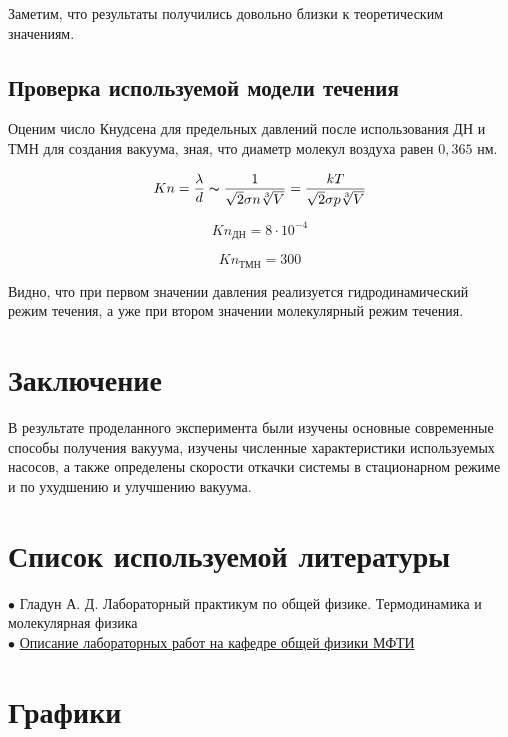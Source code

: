 \documentclass[a4paper, 12pt]{article} %
\begin{document}
Заметим, что результаты получились довольно близки к теоретическим значениям.

\subsection{Проверка используемой модели течения}

Оценим число Кнудсена для предельных давлений после использования ДН и ТМН для создания вакуума, зная, что диаметр молекул воздуха равен $0,365$ нм.

\begin{equation}
	Kn = \frac{\lambda}{d} \thicksim \frac{1}{\sqrt{2} \sigma n \sqrt[3]{V}} = \frac{kT}{\sqrt{2} \sigma p \sqrt[3]{V}}
\end{equation}

\begin{equation}
	Kn_{\text{ДН}} = 8 \cdot 10^{-4}
\end{equation}

\begin{equation}
	Kn_{\text{ТМН}} = 300
\end{equation}

Видно, что при первом значении давления реализуется гидродинамический режим течения, а уже при втором значении молекулярный режим течения.

\section{Заключение}

В результате проделанного эксперимента были изучены основные современные способы получения вакуума, изучены численные характеристики используемых насосов, а также определены скорости откачки системы в стационарном режиме и по ухудшению и улучшению вакуума.


\section{Список используемой литературы}

$\bullet$ Гладун А. Д. Лабораторный практикум по общей физике. Термодинамика и молекулярная физика\\

$\bullet$ \href{https://mipt.ru/education/chair/physics/S_II/lab/}{Описание лабораторных работ на кафедре общей физики МФТИ}



\section{Графики}
\end{document}
